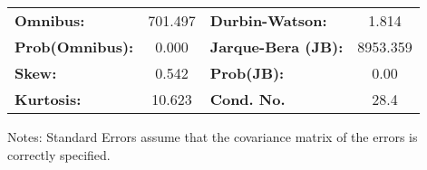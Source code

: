 \begin{center}
\begin{tabular}{lcccccc}
\bottomrule
\end{tabular}
\begin{tabular}{lclc}
\textbf{Omnibus:}       & 701.497 & \textbf{  Durbin-Watson:     } &    1.814  \\
\textbf{Prob(Omnibus):} &   0.000 & \textbf{  Jarque-Bera (JB):  } & 8953.359  \\
\textbf{Skew:}          &   0.542 & \textbf{  Prob(JB):          } &     0.00  \\
\textbf{Kurtosis:}      &  10.623 & \textbf{  Cond. No.          } &     28.4  \\
\bottomrule
\end{tabular}
\end{center}

Notes: \newline
 [1] Standard Errors assume that the covariance matrix of the errors is correctly specified.